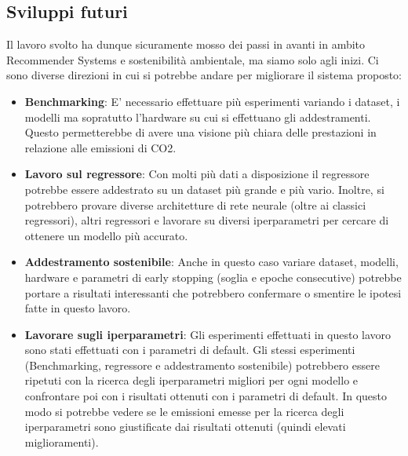 \subsection{Sviluppi futuri}
Il lavoro svolto ha dunque sicuramente mosso dei passi in avanti in ambito Recommender Systems e sostenibilità ambientale, ma siamo solo agli inizi. Ci sono diverse direzioni in cui si potrebbe andare per migliorare il sistema proposto:
\begin{itemize}
    \item \textbf{Benchmarking}: E' necessario effettuare più esperimenti variando i dataset, i modelli ma sopratutto l'hardware su cui si effettuano gli addestramenti. Questo permetterebbe di avere una visione più chiara delle prestazioni in relazione alle emissioni di CO2.
    \item \textbf{Lavoro sul regressore}: Con molti più dati a disposizione il regressore potrebbe essere addestrato su un dataset più grande e più vario. Inoltre, si potrebbero provare diverse architetture di rete neurale (oltre ai classici regressori), altri regressori e lavorare su diversi iperparametri per cercare di ottenere un modello più accurato.
    \item \textbf{Addestramento sostenibile}: Anche in questo caso variare dataset, modelli, hardware e parametri di early stopping (soglia e epoche consecutive) potrebbe portare a risultati interessanti che potrebbero confermare o smentire le ipotesi fatte in questo lavoro.
    \item \textbf{Lavorare sugli iperparametri}: Gli esperimenti effettuati in questo lavoro sono stati effettuati con i parametri di default. Gli stessi esperimenti (Benchmarking, regressore e addestramento sostenibile) potrebbero essere ripetuti con la ricerca degli iperparametri migliori per ogni modello e confrontare poi con i risultati ottenuti con i parametri di default. In questo modo si potrebbe vedere se le emissioni emesse per la ricerca degli iperparametri sono giustificate dai risultati ottenuti (quindi elevati miglioramenti).
\end{itemize}